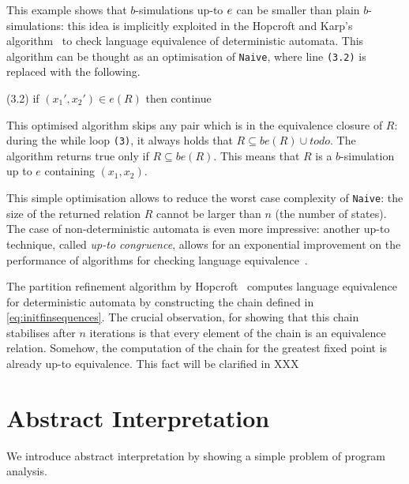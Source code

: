 \documentclass{llncs}
\begin{document}
This example shows that $b$-simulations up-to $e$ can be smaller than plain $b$-simulations: this idea is implicitly exploited in the Hopcroft and Karp's algorithm~\cite{HopcroftKarp} to check language equivalence of deterministic automata. This algorithm can be thought as an optimisation of \texttt{Naive}, where line \texttt{(3.2)} is replaced with the following.
%
\begin{codeNT}
   (3.2)  if $(x_1',x_2')\in e(R)$ then continue
\end{codeNT}
This optimised algorithm skips any pair which is in the equivalence closure of $R$: during the while loop \texttt{(3)}, it always holds that
 $R\subseteq be(R) \cup todo$. The algorithm returns true only if $R\subseteq be(R)$. This means that $R$ is a $b$-simulation up to $e$ containing $(x_1,x_2)$.

This simple optimisation allows to reduce the worst case complexity of \texttt{Naive}: the size of the returned relation $R$ cannot be larger than $n$ (the number of states).
The case of non-deterministic automata is even more impressive:
another up-to technique, called \emph{up-to congruence}, allows for
an exponential improvement on the performance of algorithms for 
checking language equivalence~\cite{bp:popl13:hkc}. 

\begin{remark}
The partition refinement algorithm by Hopcroft~\cite{hopcroft1971n} computes language equivalence for deterministic automata by constructing the chain defined in \eqref{eq:initfinsequences}. The crucial observation, for showing that this chain stabilises after $n$ iterations is that every element of the chain is an equivalence relation. Somehow, the computation of the chain for the greatest fixed point is already up-to equivalence. This fact will be clarified in XXX 
\end{remark}






\section{Abstract Interpretation}
We introduce abstract interpretation by showing a simple problem of program analysis.
\end{document}
